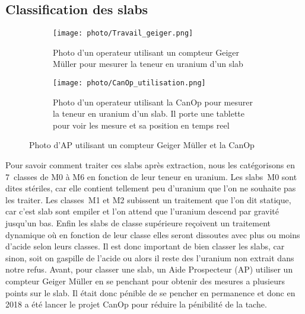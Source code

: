 \subsection{Classification des slabs}
\label{ssec_classification}
\begin{figure}

    \begin{subfigure}[t]{0.4\textwidth}
        \centering
        \texttt{[image: photo/Travail\_geiger.png]}
        \caption{Photo d'un operateur utilisant un compteur Geiger Müller pour mesurer la teneur en uranium d'un slab}
        \label{fig_AP_geiger}
    \end{subfigure}
    \begin{subfigure}[t]{0.6\textwidth}
        \centering
        \texttt{[image: photo/CanOp\_utilisation.png]}
        \caption{Photo d'un operateur utilisant la CanOp pour mesurer la teneur en uranium d'un slab. Il porte une tablette pour voir les mesure et sa position en temps reel}
        \label{fig_AP_CanOp}
    \end{subfigure}
    \caption{Photo d'AP utilisant un compteur Geiger Müller et la CanOp}
\end{figure}
Pour savoir comment traiter ces slabs  après extraction, nous les catégorisons en 7~classes de M0 à M6 en fonction de leur teneur en uranium. Les slabs~M0 sont dites stériles, car elle contient tellement peu d'uranium que l'on ne souhaite pas les traiter. Les classes~M1 et M2 subissent un traitement que l'on dit statique, car c'est slab sont empiler et l’on attend que l'uranium descend par gravité jusqu'un bas. Enfin les slabs de classe supérieure reçoivent un traitement dynamique où en fonction de leur classe elles seront dissoutes avec plus ou moins d'acide selon leurs classes. Il est donc important de bien classer les slabs, car sinon, soit on gaspille  de l'acide ou alors il reste des l'uranium non extrait dans notre refus.
Avant, pour classer une slab, un Aide Prospecteur (AP) utiliser un compteur Geiger Müller en se penchant pour obtenir des mesures a plusieurs points sur le slab. Il était donc pénible de se pencher en permanence et donc en 2018 a été lancer le projet CanOp pour réduire la pénibilité de la tache.
